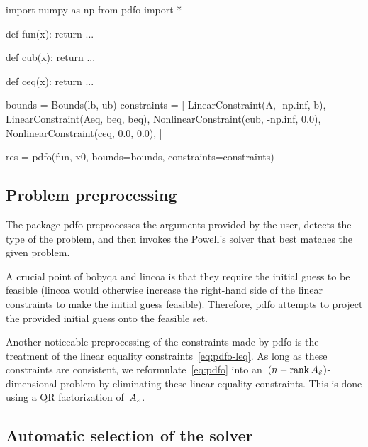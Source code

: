 \pagebreak

\begin{lstpython}[%
    caption=An elementary example of using \gls{pdfo} in Python,
    label=lst:minimum-example-python,
]
    import numpy as np
    from pdfo import *

    def fun(x):
        return ...
    
    def cub(x):
        return ...
    
    def ceq(x):
        return ...
    
    bounds = Bounds(lb, ub)
    constraints = [
        LinearConstraint(A, -np.inf, b),
        LinearConstraint(Aeq, beq, beq),
        NonlinearConstraint(cub, -np.inf, 0.0),
        NonlinearConstraint(ceq, 0.0, 0.0),
    ]

    res = pdfo(fun, x0, bounds=bounds, constraints=constraints)
\end{lstpython}

\subsection{Problem preprocessing}
\label{subsec:pdfo-preprocessing}

The package \gls{pdfo} preprocesses the arguments provided by the user, detects the type of the problem, and then invokes the Powell's solver that best matches the given problem.

A crucial point of \gls{bobyqa} and \gls{lincoa} is that they require the initial guess to be feasible (\gls{lincoa} would otherwise increase the right-hand side of the linear constraints to make the initial guess feasible).
Therefore, \gls{pdfo} attempts to project the provided initial guess onto the feasible set.

Another noticeable preprocessing of the constraints made by \gls{pdfo} is the treatment of the linear equality constraints~\cref{eq:pdfo-leq}.
As long as these constraints are consistent, we reformulate~\cref{eq:pdfo} into an~$(n - \operatorname{rank} A_{\scriptscriptstyle\mathcal{E}})$-dimensional problem by eliminating these linear equality constraints.
This is done using a QR factorization of~$A_{\scriptscriptstyle\mathcal{E}}$.

\subsection{Automatic selection of the solver}
\label{subsec:solver-selection}

